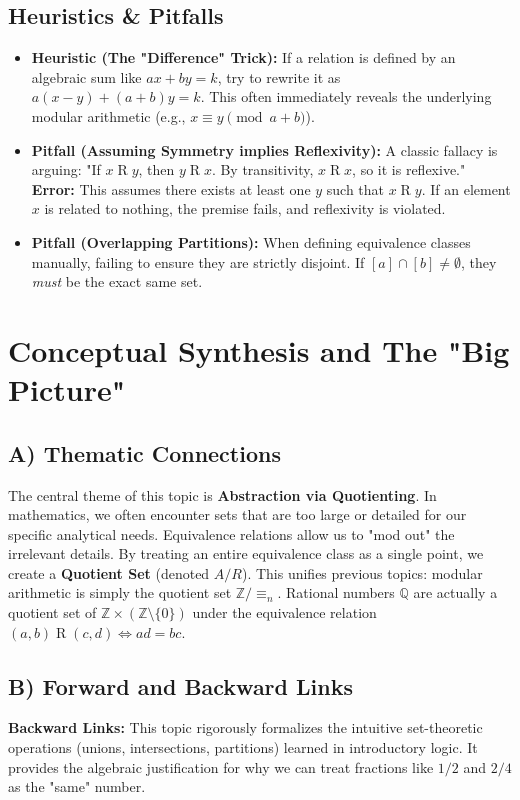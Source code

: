 \documentclass[11pt, a4paper]{article}
\theoremstyle{definition}
\theoremstyle{remark}
\newcommand{\Z}{\mathbb{Z}}
\newcommand{\Q}{\mathbb{Q}}
\begin{document}
\subsection{Heuristics \& Pitfalls}
\begin{itemize}
    \item \textbf{Heuristic (The "Difference" Trick):} If a relation is defined by an algebraic sum like $ax + by = k$, try to rewrite it as $a(x - y) + (a+b)y = k$. This often immediately reveals the underlying modular arithmetic (e.g., $x \equiv y \pmod{a+b}$).
    \item \textbf{Pitfall (Assuming Symmetry implies Reflexivity):} A classic fallacy is arguing: "If $x \mathrel{R} y$, then $y \mathrel{R} x$. By transitivity, $x \mathrel{R} x$, so it is reflexive." \textbf{Error:} This assumes there exists at least one $y$ such that $x \mathrel{R} y$. If an element $x$ is related to nothing, the premise fails, and reflexivity is violated.
    \item \textbf{Pitfall (Overlapping Partitions):} When defining equivalence classes manually, failing to ensure they are strictly disjoint. If $[a] \cap [b] \neq \emptyset$, they \textit{must} be the exact same set.
\end{itemize}

\newpage
\section{Conceptual Synthesis and The "Big Picture"}

\subsection{A) Thematic Connections}
The central theme of this topic is \textbf{Abstraction via Quotienting}. In mathematics, we often encounter sets that are too large or detailed for our specific analytical needs. Equivalence relations allow us to "mod out" the irrelevant details. By treating an entire equivalence class as a single point, we create a \textbf{Quotient Set} (denoted $A/R$). 
This unifies previous topics: modular arithmetic is simply the quotient set $\Z / \equiv_n$. Rational numbers $\Q$ are actually a quotient set of $\Z \times (\Z \setminus \{0\})$ under the equivalence relation $(a,b) \mathrel{R} (c,d) \iff ad = bc$.

\subsection{B) Forward and Backward Links}
\textbf{Backward Links:} This topic rigorously formalizes the intuitive set-theoretic operations (unions, intersections, partitions) learned in introductory logic. It provides the algebraic justification for why we can treat fractions like $1/2$ and $2/4$ as the "same" number.
\end{document}
